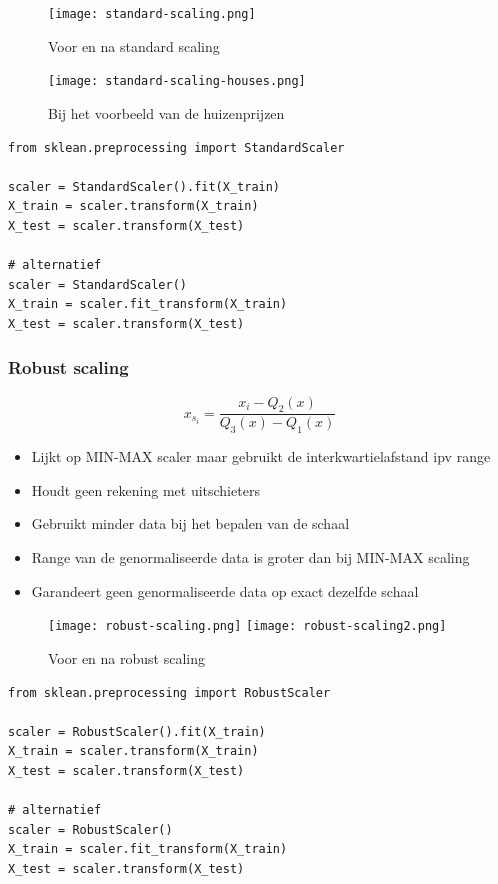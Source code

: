 \documentclass{article}
\begin{document}
\begin{figure}[H]
    \centering
    \texttt{[image: standard-scaling.png]}
    \caption{Voor en na standard scaling}
\end{figure}

\begin{figure}[H]
    \centering
    \texttt{[image: standard-scaling-houses.png]}
    \caption{Bij het voorbeeld van de huizenprijzen}
\end{figure}


\begin{verbatim}
from sklean.preprocessing import StandardScaler

scaler = StandardScaler().fit(X_train)
X_train = scaler.transform(X_train)
X_test = scaler.transform(X_test)

# alternatief
scaler = StandardScaler()
X_train = scaler.fit_transform(X_train)
X_test = scaler.transform(X_test)
\end{verbatim}

\subsubsection{Robust scaling}

\begin{equation}
x_{s_i} = \frac{x_i - Q_2(x)}{Q_3(x) - Q_1(x)}
\end{equation}

\begin{itemize}
    \item Lijkt op MIN-MAX scaler maar gebruikt de interkwartielafstand ipv range
    \item Houdt geen rekening met uitschieters
    \item Gebruikt minder data bij het bepalen van de schaal
    \item Range van de genormaliseerde data is groter dan bij MIN-MAX scaling
    \item Garandeert geen genormaliseerde data op exact dezelfde schaal
\end{itemize}

\begin{figure}[H]
    \centering
    \texttt{[image: robust-scaling.png]}
    \texttt{[image: robust-scaling2.png]}
    \caption{Voor en na robust scaling}
\end{figure}

\begin{verbatim}
from sklean.preprocessing import RobustScaler

scaler = RobustScaler().fit(X_train)
X_train = scaler.transform(X_train)
X_test = scaler.transform(X_test)

# alternatief
scaler = RobustScaler()
X_train = scaler.fit_transform(X_train)
X_test = scaler.transform(X_test)
\end{verbatim}
\end{document}
